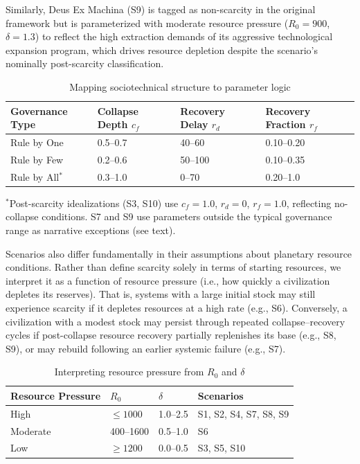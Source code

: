 Similarly, Deus Ex Machina (S9) is tagged as non-scarcity in the original framework but is parameterized with moderate resource pressure ($R_0 = 900$, $\delta = 1.3$) to reflect the high extraction demands of its aggressive technological expansion program, which drives resource depletion despite the scenario's nominally post-scarcity classification.

\begin{table}[htbp]
\centering
\caption{Mapping sociotechnical structure to parameter logic}
\label{tab:governance}
\begin{tabular}{llll}
\toprule
Governance Type & Collapse Depth $c_f$ & Recovery Delay $r_d$ & Recovery Fraction $r_f$ \\
\midrule
Rule by One & 0.5--0.7 & 40--60 & 0.10--0.20 \\
Rule by Few & 0.2--0.6 & 50--100 & 0.10--0.35 \\
Rule by All$^{*}$ & 0.3--1.0 & 0--70 & 0.20--1.0 \\
\bottomrule
\end{tabular}

\smallskip
{\footnotesize $^{*}$Post-scarcity idealizations (S3, S10) use $c_f = 1.0$, $r_d = 0$, $r_f = 1.0$, reflecting no-collapse conditions. S7 and S9 use parameters outside the typical governance range as narrative exceptions (see text).}
\end{table}

Scenarios also differ fundamentally in their assumptions about planetary resource conditions. Rather than define scarcity solely in terms of starting resources, we interpret it as a function of resource pressure (i.e., how quickly a civilization depletes its reserves). That is, systems with a large initial stock may still experience scarcity if it depletes resources at a high rate (e.g., S6). Conversely, a civilization with a modest stock may persist through repeated collapse--recovery cycles if post-collapse resource recovery partially replenishes its base (e.g., S8, S9), or may rebuild following an earlier systemic failure (e.g., S7).

\begin{table}[htbp]
\centering
\caption{Interpreting resource pressure from $R_0$ and $\delta$}
\label{tab:resources}
\begin{tabular}{llll}
\toprule
Resource Pressure & $R_0$ & $\delta$ & Scenarios \\
\midrule
High & $\leq 1000$ & 1.0--2.5 & S1, S2, S4, S7, S8, S9 \\
Moderate & 400--1600 & 0.5--1.0 & S6 \\
Low & $\geq 1200$ & 0.0--0.5 & S3, S5, S10 \\
\bottomrule
\end{tabular}
\end{table}

